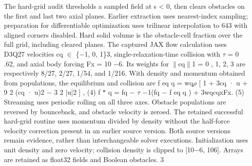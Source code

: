 \documentclass[11pt]{article}
\begin{document}
The hard-grid audit thresholds a sampled field at s < 0, then clears obstacles on the first and
last two axial planes. Earlier extraction uses nearest-index sampling; preparation for differentiable
optimization uses trilinear interpolation to 643 with aligned corners disabled. Hard solid volume is
the obstacle-cell fraction over the full grid, including cleared planes.
The captured JAX flow calculation uses D3Q27 velocities cq \ensuremath{\in} \{\ensuremath{-}1, 0, 1\}3, single-relaxation-time
collision with \ensuremath{\tau} = 0 .62, and axial body forcing Fx = 10 \ensuremath{-}6. Its weights for \ensuremath{\parallel}cq\ensuremath{\parallel}1 = 0 , 1, 2, 3 are
respectively 8/27, 2/27, 1/54, and 1/216. With density and momentum obtained from populations,
the equilibrium and collision are
f eq
q = wq\ensuremath{\rho}
[
1 + 3cq · u + 9
2 (cq · u)2 \ensuremath{-} 3
2 |u|2
]
, (4)
f \ensuremath{\ast}
q = fq \ensuremath{-} \ensuremath{\tau} \ensuremath{-}1(fq \ensuremath{-} f eq
q ) + 3wqcqxFx. (5)
Streaming uses periodic rolling on all three axes. Obstacle populations are reversed by bounceback,
and obstacle velocity is zeroed. The retained successful hard-grid routine uses momentum divided
by density without the half-force velocity correction present in an earlier source version. Both
source versions remain evidence, rather than interchangeable solver executions. Initialization uses
unit density and zero velocity; collision density is clipped to [10\ensuremath{-}6, 106]. Arrays are retained as
float32 fields and Boolean obstacles.
3
\end{document}

